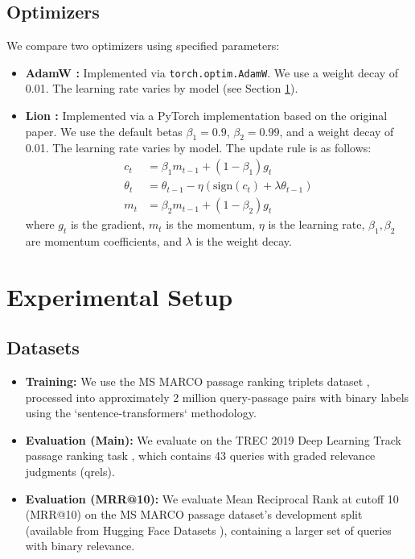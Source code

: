 \documentclass[conference]{IEEEtran}
\begin{document}
\subsection{Optimizers}
We compare two optimizers using specified parameters:
\begin{itemize}
    \item \textbf{AdamW \cite{loshchilov2019decoupled}:} Implemented via \texttt{torch.optim.AdamW}. We use a weight decay of 0.01. The learning rate varies by model (see Section \ref{sec:experimental_setup}).
    \item \textbf{Lion \cite{chen2023symbolic}:} Implemented via a PyTorch implementation based on the original paper. We use the default betas $\beta_1 = 0.9$, $\beta_2 = 0.99$, and a weight decay of 0.01. The learning rate varies by model. The update rule is as follows:
    \begin{align*}
    c_t &= \beta_1 m_{t-1} + (1 - \beta_1) g_t \\
    \theta_t &= \theta_{t-1} - \eta \left( \text{sign}(c_t) + \lambda \theta_{t-1} \right) \\
    m_t &= \beta_2 m_{t-1} + (1 - \beta_2) g_t
    \end{align*}
    where $g_t$ is the gradient, $m_t$ is the momentum, $\eta$ is the learning rate, $\beta_1, \beta_2$ are momentum coefficients, and $\lambda$ is the weight decay.
\end{itemize}

\section{Experimental Setup}
\label{sec:experimental_setup}

\subsection{Datasets}
\begin{itemize}
    \item \textbf{Training:} We use the MS MARCO passage ranking triplets dataset \cite{DBLP:journals/corr/NguyenRSGTMD16}, processed into approximately 2 million query-passage pairs with binary labels using the `sentence-transformers` methodology.
    \item \textbf{Evaluation (Main):} We evaluate on the TREC 2019 Deep Learning Track passage ranking task \cite{craswell2020overview}, which contains 43 queries with graded relevance judgments (qrels).
    \item \textbf{Evaluation (MRR@10):} We evaluate Mean Reciprocal Rank at cutoff 10 (MRR@10) on the MS MARCO passage dataset's development split (available from Hugging Face Datasets \cite{DBLP:journals/corr/NguyenRSGTMD16}), containing a larger set of queries with binary relevance.
\end{itemize}
\end{document}
